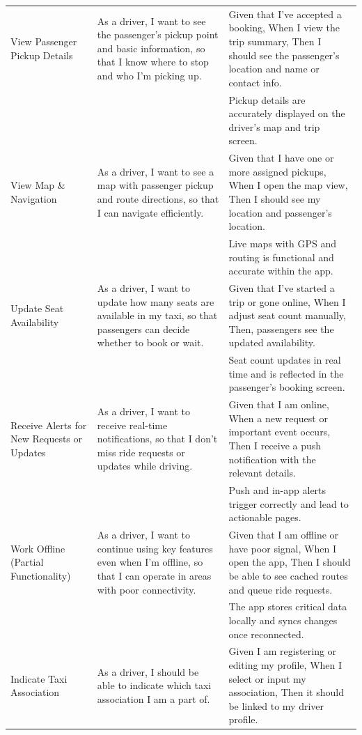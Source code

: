\documentclass[a4paper,12pt]{article}
\begin{document}
\begin{longtable}{>{\raggedright}p{4cm} p{6cm} p{5cm}}
View Passenger Pickup Details & As a driver, I want to see the passenger’s pickup point and basic information, so that I know where to stop and who I’m picking up. & Given that I’ve accepted a booking, When I view the trip summary, Then I should see the passenger’s location and name or contact info. \\
& & Pickup details are accurately displayed on the driver's map and trip screen. \\ \midrule
View Map \& Navigation & As a driver, I want to see a map with passenger pickup and route directions, so that I can navigate efficiently. & Given that I have one or more assigned pickups, When I open the map view, Then I should see my location and passenger's location. \\
& & Live maps with GPS and routing is functional and accurate within the app. \\ \midrule
Update Seat Availability & As a driver, I want to update how many seats are available in my taxi, so that passengers can decide whether to book or wait. & Given that I’ve started a trip or gone online, When I adjust seat count manually, Then, passengers see the updated availability. \\
& & Seat count updates in real time and is reflected in the passenger’s booking screen. \\ \midrule
Receive Alerts for New Requests or Updates & As a driver, I want to receive real-time notifications, so that I don’t miss ride requests or updates while driving. & Given that I am online, When a new request or important event occurs, Then I receive a push notification with the relevant details. \\
& & Push and in-app alerts trigger correctly and lead to actionable pages. \\ \midrule
Work Offline (Partial Functionality) & As a driver, I want to continue using key features even when I’m offline, so that I can operate in areas with poor connectivity. & Given that I am offline or have poor signal, When I open the app, Then I should be able to see cached routes and queue ride requests. \\
& & The app stores critical data locally and syncs changes once reconnected. \\ \midrule
Indicate Taxi Association & As a driver, I should be able to indicate which taxi association I am a part of. & Given I am registering or editing my profile, When I select or input my association, Then it should be linked to my driver profile. \\

\end{longtable}
\end{document}
